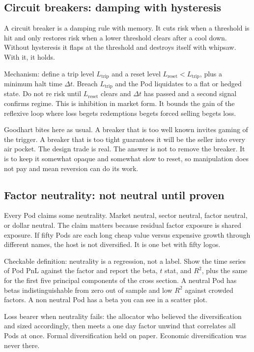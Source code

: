 \documentclass[11pt]{article}
\begin{document}
\subsection{Circuit breakers: damping with hysteresis}

A circuit breaker is a damping rule with memory. It cuts risk when a threshold is hit and only restores risk when a lower threshold clears after a cool down. Without hysteresis it flaps at the threshold and destroys itself with whipsaw. With it, it holds.

Mechanism: define a trip level $L_{\text{trip}}$ and a reset level $L_{\text{reset}} < L_{\text{trip}}$, plus a minimum halt time $\Delta t$. Breach $L_{\text{trip}}$ and the Pod liquidates to a flat or hedged state. Do not re risk until $L_{\text{reset}}$ clears and $\Delta t$ has passed and a second signal confirms regime. This is inhibition in market form. It bounds the gain of the reflexive loop where loss begets redemptions begets forced selling begets loss.

Goodhart bites here as usual. A breaker that is too well known invites gaming of the trigger. A breaker that is too tight guarantees it will be the seller into every air pocket. The design trade is real. The answer is not to remove the breaker. It is to keep it somewhat opaque and somewhat slow to reset, so manipulation does not pay and mean reversion can do its work.

\subsection{Factor neutrality: not neutral until proven}

Every Pod claims some neutrality. Market neutral, sector neutral, factor neutral, or dollar neutral. The claim matters because residual factor exposure is shared exposure. If fifty Pods are each long cheap value versus expensive growth through different names, the host is not diversified. It is one bet with fifty logos.

Checkable definition: neutrality is a regression, not a label. Show the time series of Pod PnL against the factor and report the beta, $t$ stat, and $R^2$, plus the same for the first five principal components of the cross section. A neutral Pod has betas indistinguishable from zero out of sample and low $R^2$ against crowded factors. A non neutral Pod has a beta you can see in a scatter plot.

Loss bearer when neutrality fails: the allocator who believed the diversification and sized accordingly, then meets a one day factor unwind that correlates all Pods at once. Formal diversification held on paper. Economic diversification was never there.
\end{document}
